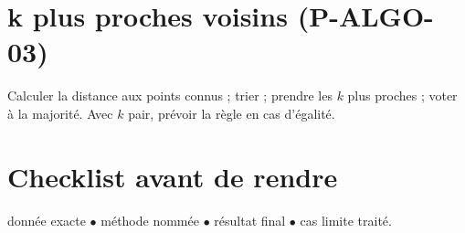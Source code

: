 \documentclass[a4paper,11pt]{article}
\begin{document}
\section*{k plus proches voisins (P-ALGO-03)}
Calculer la distance aux points connus ; trier ; prendre les $k$ plus proches ; voter à la majorité. Avec $k$ pair, prévoir la règle en cas d'égalité.

\section*{Checklist avant de rendre}
donnée exacte $\bullet$ méthode nommée $\bullet$ résultat final $\bullet$ cas limite traité.
\end{document}
